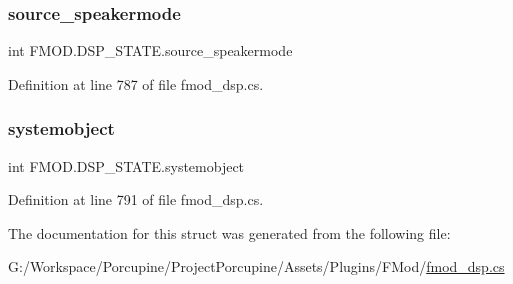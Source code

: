 \subsubsection{\texorpdfstring{source\+\_\+speakermode}{source\_speakermode}}
{\footnotesize\ttfamily int F\+M\+O\+D.\+D\+S\+P\+\_\+\+S\+T\+A\+T\+E.\+source\+\_\+speakermode}



Definition at line 787 of file fmod\+\_\+dsp.\+cs.

\mbox{\label{struct_f_m_o_d_1_1_d_s_p___s_t_a_t_e_aee50aacad7a3c70da70092ddec594e3a}} 
\subsubsection{\texorpdfstring{systemobject}{systemobject}}
{\footnotesize\ttfamily int F\+M\+O\+D.\+D\+S\+P\+\_\+\+S\+T\+A\+T\+E.\+systemobject}



Definition at line 791 of file fmod\+\_\+dsp.\+cs.



The documentation for this struct was generated from the following file\+:\begin{DoxyCompactItemize}
\item 
G\+:/\+Workspace/\+Porcupine/\+Project\+Porcupine/\+Assets/\+Plugins/\+F\+Mod/\hyperlink{fmod__dsp_8cs}{fmod\+\_\+dsp.\+cs}\end{DoxyCompactItemize}
